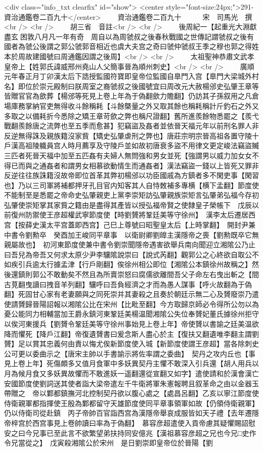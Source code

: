 <div class="info_txt clearfix" id="show">
<center style="font-size:24px;">291-資治通鑑卷二百九十</center>
  　　資治通鑑卷二百九十　　　宋　司馬光　撰<br />
<br />
　　胡三省　音註<br />
<br />
　　後周紀一【起重光大淵獻盡玄困敦八月凡一年有奇　周自以為周虢叔之後春秋戰國之世傳記謂虢叔之後有國者為虢公後謂之郭公虢郭音相近也虞大夫宫之奇曰虢仲虢叔王季之穆也郭之得姓本於周故建國號曰周通鑑因謂之後周】<br />
<br />
　　太祖聖神恭肅文武孝皇帝上【姓郭氏諱威邢州堯山人父簡事晉為順州刺史】<br />
<br />
　　廣順元年春正月丁卯漢太后下誥授監國符寶即皇帝位監國自臯門入宫【臯門大梁城外村名】即位於崇元殿制曰朕周室之裔虢叔之後國號宜曰周改元大赦楊邠史弘肇王章等皆贈官官為歛葬【楊邠等死見上卷上年為于偽翻歛力贍翻】仍訪其子孫叙用之凡倉場庫務掌納官吏無得收斗餘稱耗【斗餘槩量之外又取其餘也稱耗稱計斤釣石之外又多取之以備耗折今悉除之矯王章苛歛之弊也稱尺證翻】舊所進羨餘物悉罷之【羨弋戰翻羨餘唐之流弊也至五季而愈甚】犯竊盜及姦者並依晉天福元年以前刑名罪人非反逆無得誅及親族籍沒家貲【矯史弘肇虐刑之弊也】唐莊宗明宗晉高祖各置守陵十戶漢高祖陵軄員宫人時月薦享及守陵戶並如故初唐衰多盜不用律文更定峻法竊盜贓三匹者死晉天福中加至五匹姦有夫婦人無問強和男女並死【強謂男以威力加女女不得已而與之通姦者和謂男女相慕欲動情生而通姦者】漢法竊盜一錢以上皆死又罪非反逆往往族誅籍沒故帝即位首革其弊初楊邠以功臣國戚為方鎮者多不閑吏事【閑習也】乃以三司軍將補都押牙孔目官内知客其人自恃敇補多專横【横下孟翻】節度使不能制至是悉罷之帝命史弘肇親吏上黨李崇矩訪弘肇親族崇矩言弘肇弟弘福今存初弘肇使崇矩掌其家貲之籍由是盡得其產皆以授弘福帝賢之使隸皇子榮帳下　戊辰以前復州防禦使王彦超權武寧節度使【時劉贇將鞏廷美等守徐州】　漢李太后遷居西宫【按薛史漢太平宫蓋即西宫】己巳上尊號曰昭聖皇太后【上時掌翻】　開封尹兼中書令劉勲卒　癸酉加王峻同平章事　以衛尉卿劉皥主漢隱帝之喪【劉勲既卒它無親屬故也】　初河東節度使兼中書令劉崇聞隱帝遇害欲舉兵南向聞迎立湘隂公乃止曰吾兒為帝吾又何求太原少尹李驤隂說崇曰【說式芮翻】觀郭公之心終欲自取公不如疾引兵逾太行據孟津【行戶剛翻】俟徐州相公即位【湘隂公本鎮徐州故稱之】然後還鎮則郭公不敢動矣不然且為所賣崇怒曰腐儒欲離間吾父子命左右曳出斬之【間古莧翻曳讀曰拽音羊列翻】驤呼曰吾負經濟之才而為愚人謀事【呼火故翻為于偽翻】死固甘心家有老妻願與之同死崇并其妻殺之且奏於朝廷示無二心及贇廢崇乃遣使請贇歸晉陽詔報以湘隂公比在宋州【比毗至翻】今方取歸京師必令得所公勿以為憂公能同力相輔當加王爵永鎮河東鞏廷美楊温聞湘隂公失位奉贇妃董氏據徐州拒守以俟河東援兵【劉贇令鞏廷美等守徐州事始見上卷上年】帝使贇以書諭之廷美温欲降而懼死【降戶江翻】帝復遺贇書曰爰念斯人盡心於主【復扶又翻遺唯李翻主謂劉贇】足以賞其忠義何由責以悔尤俟新節度使入城【新節度使謂王彦超】當各除刺史公可更以委曲示之【唐宋主帥以手書諭示將佐率謂之委曲】　契丹之攻内丘也【事見上卷上年】死傷頗多又值月食軍中多妖異契丹主懼不敢深入引兵還【胡人用兵以月為候月食又多妖異故懼而不敢進妖一遥翻還從宣翻又如字】遣使請和於漢會漢亡安國節度使劉詞送其使者詣大梁帝遣左千牛衛將軍朱憲報聘且叙革命之由以金器玉帶贈之　帝以鄴都鎮撫河北控制契丹欲以腹心處之【處昌呂翻】乙亥以寧江節度使侍衛親軍都指揮使王殷為鄴都留守天雄節度使同平章事領軍如故【仍領侍衛親軍】仍以侍衛司從赴鎮　丙子帝帥百官詣西宫為漢隱帝舉哀成服皆如天子禮【去年遷隱帝梓宫於西宫事見上卷帥讀曰率為于偽翻】　慕容彦超遣使入貢帝慮其疑懼賜詔慰安之曰今兄事已至此言不欲繁望弟扶持同安億兆【漢祖慕容彦超之兄也今兄□史作令兄當從之】　戊寅殺湘隂公於宋州　是日劉崇即皇帝位於晉陽【劉